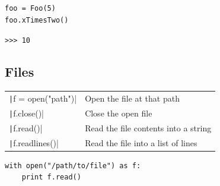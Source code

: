 \documentclass[10pt,a4paper,oneside]{article}
\begin{document}
\begin{landscape}
\begin{multicols}{3}
\begin{verbatim}
foo = Foo(5)
foo.xTimesTwo()
\end{verbatim}
\texttt{>>> 10}

\vspace{-0.25cm}
\subsection*{Files}

\begin{tabular}{lp{5cm}}
\texttt|f = open("path")| &
{\small Open the file at that path}\\
%
\texttt|f.close()| &
{\small Close the open file}\\
%
\texttt|f.read()| &
{\small Read the file contents into a string}\\
%
\texttt|f.readlines()| &
{\small Read the file into a list of lines}
\end{tabular}

\begin{verbatim}
with open("/path/to/file") as f:
    print f.read()
\end{verbatim}

\vfill

\end{multicols}
\end{landscape}
\end{document}
